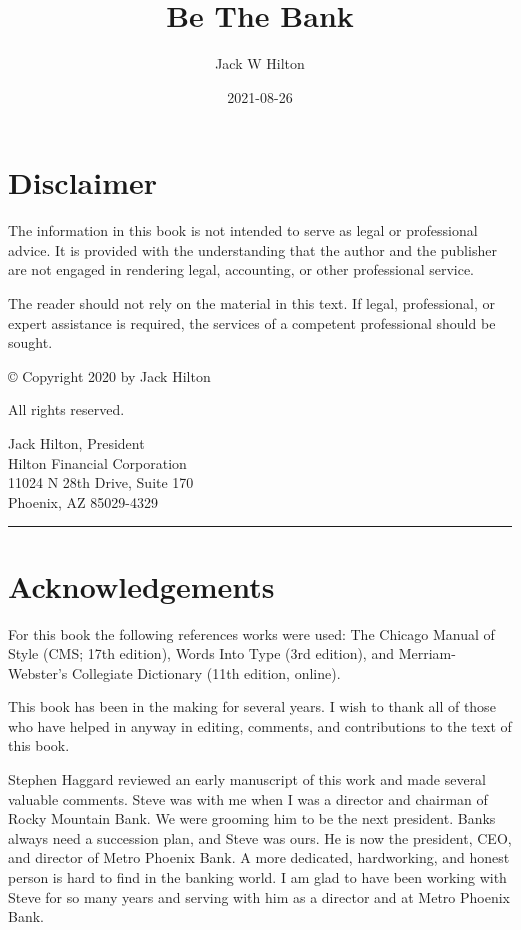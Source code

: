 \documentclass[
]{book}
\title{Be The Bank}
\author{Jack W Hilton}
\date{2021-08-26}
\begin{document}
\maketitle

{
\setcounter{tocdepth}{1}
\tableofcontents
}
\hypertarget{disclaimer}{%
\chapter*{Disclaimer}\label{disclaimer}}


The information in this book is not intended to serve as legal or professional advice. It is provided with the understanding that the author and the publisher are not engaged in rendering legal, accounting, or other professional service.

The reader should not rely on the material in this text. If legal, professional, or expert assistance is required, the services of a competent professional should be sought.

© Copyright 2020 by Jack Hilton

All rights reserved.

Jack Hilton, President\\
Hilton Financial Corporation\\
11024 N 28th Drive, Suite 170\\
Phoenix, AZ 85029-4329

\begin{center}\rule{0.5\linewidth}{0.5pt}\end{center}

\hypertarget{acknowledgements}{%
\chapter*{Acknowledgements}\label{acknowledgements}}


For this book the following references works were used: The Chicago Manual of Style (CMS; 17th edition), Words Into Type (3rd edition), and Merriam-Webster's Collegiate Dictionary (11th edition, online).

This book has been in the making for several years. I wish to thank all of those who have helped in anyway in editing, comments, and contributions to the text of this book.

Stephen Haggard reviewed an early manuscript of this work and made several valuable comments. Steve was with me when I was a director and chairman of Rocky Mountain Bank. We were grooming him to be the next president. Banks always need a succession plan, and Steve was ours. He is now the president, CEO, and director of Metro Phoenix Bank. A more dedicated, hardworking, and honest person is hard to find in the banking world. I am glad to have been working with Steve for so many years and serving with him as a director and at Metro Phoenix Bank.
\end{document}
